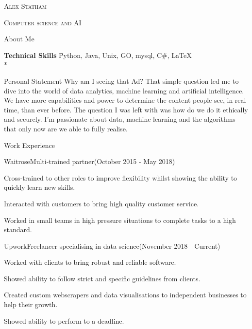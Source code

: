 \documentclass[]{article}
\newlength{\tabin}
\newlength{\secsep}
\newcommand{\lineunder}{\vspace*{-8pt} \\ \hspace*{-6pt} \hrulefill \\ \vspace*{-15pt}}
\newcommand{\name}[1]{\begin{center}\textsc{\Huge#1}\\\end{center}}
\newcommand{\program}[1]{\begin{center}\textsc{#1}\end{center}}
\newcommand{\contact}[1]{\begin{center}\color{contactgray}{\small#1}\end{center}}
\newcommand{\contactnumber}[1]{\begin{center}\color{contactgray}{\small#1}\end{center}}
\newenvironment{tabbedsection}[1]{
  \begin{list}{}{
      \setlength{\itemsep}{0pt}
      \setlength{\labelsep}{0pt}
      \setlength{\labelwidth}{0pt}
      \setlength{\leftmargin}{\tabin}
      \setlength{\rightmargin}{\tabin}
      \setlength{\listparindent}{0pt}
      \setlength{\parsep}{0pt}
      \setlength{\parskip}{0pt}
      \setlength{\partopsep}{0pt}
      \setlength{\topsep}{#1}
    }
  \item[]
}{\end{list}}
\newenvironment{nospacetabbing}{
    \begin{tabbing}
}{\end{tabbing}\vspace{-1.2em}}
\newenvironment{resume_header}{}{\vspace{0pt}}
\newenvironment{resume_section}[1]{
  \filbreak
  \vspace{2\secsep}
  \textsc{\large#1}
  \lineunder
  \begin{tabbedsection}{\secsep}
}{\end{tabbedsection}}
\newenvironment{subitems}{
  \renewcommand{\labelitemi}{-}
  \begin{itemize}
      \setlength{\labelsep}{1em}
}{\end{itemize}}
\newenvironment{resume_employer}[4]{
  \vspace{\secsep}
  \textbf{#1} \\ 
  \indent {\small #2} \hfill {\footnotesize#3 (#4)}
  \begin{tabbedsection}{0pt}
  \begin{subitems}
}{\end{subitems}\end{tabbedsection}}
\begin{document}
\begin{resume_header}
\name{Alex Statham}
\program{Computer science and AI}
\contact{$\bullet$ alex.staham1998@gmail.com           $\bullet$ +447490973388 }
\contactnumber{$\bullet$ astatham.com}     
\end{resume_header}

\begin{resume_section}{About Me}
  \begin{nospacetabbing}

  \textbf{Technical Skills}  \= Python, Java, Unix, GO, mysql, C#,  \LaTeX\\*
  \end{nospacetabbing}

\end{resume_section}

\begin{resume_section}{Personal Statement}
Why am I seeing that Ad? That simple question led  me to dive into the world of data analytics, machine learning and  artificial intelligence. We have more capabilities and power to determine the content people see, in real-time, than ever before. The question I was left with was how do we do it ethically and securely. I'm passionate about data, machine learning and the algorithms that only now are we able to fully realise.
\end{resume_section}

\begin{resume_section}{Work Experience}
	\begin{resume_employer}{Waitrose}{Multi-trained partner}{(October 2015 - May 2018)}{}
    \item Cross-trained to other roles to improve flexibility whilst showing the ability to quickly learn new skills.
    \item Interacted with customers to bring high quality customer service.
    \item Worked in small teams in high pressure situations to complete tasks to a high standard.
  \end{resume_employer}
  
  \begin{resume_employer}{Upwork}{Freelancer specialising in data science}{(November 2018 - Current)}{}
    \item Worked with clients to bring robust and reliable software.
    \item Showed ability to follow strict and specific guidelines from clients.
    \item Created custom webscrapers and data visualisations to independent businesses to help their growth.
    \item Showed ability to perform to a deadline.
  \end{resume_employer}
\end{resume_section}
\end{document}

